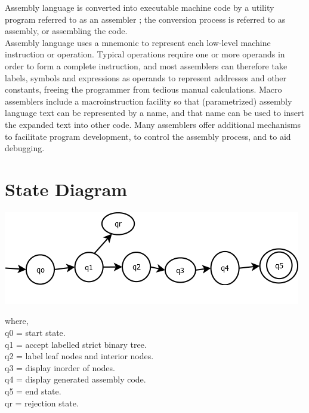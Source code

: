 \documentclass[12pt]{article}
\begin{document}
Assembly language is converted into executable machine code by a utility program
referred to as an assembler ; the conversion process is referred to as assembly,
or assembling the code.\\

Assembly language uses a mnemonic to represent each low-level machine instruction
or operation. Typical operations require one or more operands in order
to form a complete instruction, and most assemblers can therefore take labels,
symbols and expressions as operands to represent addresses and other constants,
freeing the programmer from tedious manual calculations. Macro assemblers include
a macroinstruction facility so that (parametrized) assembly language text
can be represented by a name, and that name can be used to insert the expanded
text into other code. Many assemblers offer additional mechanisms to facilitate
program development, to control the assembly process, and to aid debugging.\\


\section{State Diagram }
\includegraphics{a5state}

where,\\
q0 = start state.\\
q1 = accept labelled strict binary tree.\\
q2 = label leaf nodes and interior nodes.\\
q3 = display inorder of nodes.\\
q4 = display generated assembly code.\\
q5 = end state.\\
qr = rejection state.\\
\end{document}
